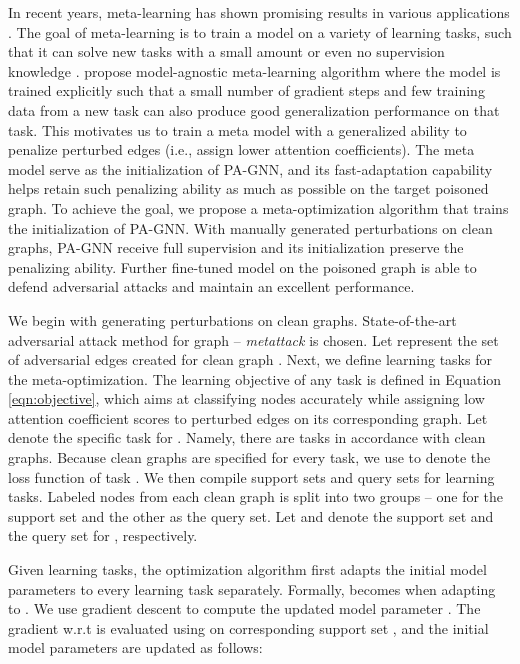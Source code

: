 \documentclass[sigconf]{acmart}
\newcommand{\ours}{{PA-GNN}\xspace}
\begin{document}
In recent years, meta-learning has shown promising results in various applications \cite{santoro2016meta,vinyals2016matching,yao2019learning,yao2019graph}. The goal of meta-learning is to train a model on a variety of learning tasks, such that it can solve new tasks with a small amount or even no supervision knowledge \cite{hochreiter2001learning,finn2017model,yao2019hierarchically}.
\citeauthor{finn2017model} \cite{finn2017model} propose model-agnostic meta-learning algorithm  where the model is trained explicitly such that a small number of gradient steps and few training data from a new task can also produce good generalization performance on that task. 
This motivates us to train a meta model with a generalized ability to penalize perturbed edges (i.e., assign lower attention coefficients).
The meta model serve as the initialization of \ours, and its fast-adaptation capability helps retain such penalizing ability as much as possible on the target poisoned graph. 
To achieve the goal, we propose a meta-optimization algorithm that trains the initialization of \ours. With manually generated perturbations on clean graphs, \ours receive full supervision and its initialization preserve the penalizing ability. 
Further fine-tuned model on the poisoned graph  is able to defend adversarial attacks and maintain an excellent performance.

We begin with generating perturbations on clean graphs. State-of-the-art adversarial attack method for graph -- \textit{metattack} \cite{zugner2018adversarial2} is chosen. Let  represent the set of adversarial edges created for clean graph . 
Next, we define learning tasks for the meta-optimization. 
The learning objective of any task is defined in Equation \ref{eqn:objective}, which aims at classifying nodes accurately while assigning low attention coefficient scores to perturbed edges on its corresponding graph. Let  denote the specific task for . Namely, there are  tasks in accordance with clean graphs.
Because clean graphs are specified for every task, we use  to denote the loss function of task . 
We then compile support sets and query sets for learning tasks. Labeled nodes from each clean graph is split into two groups -- one for the support set and the other as the query set. Let  and   denote the support set and the query set for , respectively. 

Given  learning tasks, the optimization algorithm first adapts the initial model parameters to every learning task separately. 
Formally,  becomes  when adapting to . We use gradient descent to compute the updated model parameter . The gradient w.r.t  is evaluated using   on corresponding support set , and the initial model parameters  are updated as follows:
\end{document}

